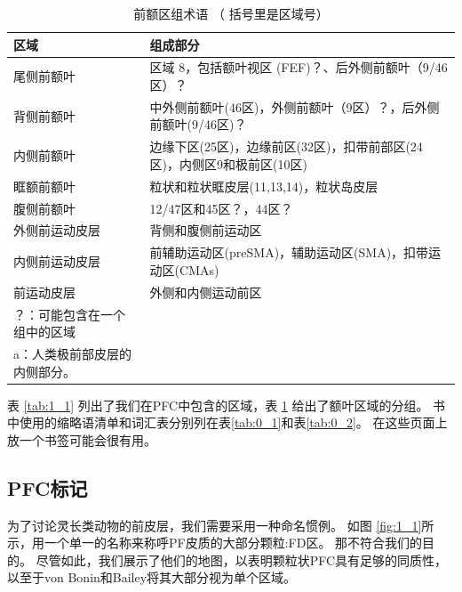 \begin{table}[htbp] 
	\newcommand{\tabincell}[2]{\begin{tabular}{@{}#1@{}}#2\end{tabular}} %
	\centering
	\caption{前额区组术语 （ 括号里是区域号）\label{tab:1_2}}
	\renewcommand\arraystretch{1.5}	%
	\begin{tabular}{ll}
		\toprule
		区域 & 组成部分 \\
		\midrule
		尾侧前额叶 & 区域 8，包括额叶视区 (FEF)？、后外侧前额叶（9/46区）？  \\
		背侧前额叶 & 中外侧前额叶(46区)，外侧前额叶（9区）？，后外侧前额叶(9/46区)？ \\
		内侧前额叶&边缘下区(25区)，边缘前区(32区)，扣带前部区(24区)，内侧区9和极前区(10区)  \\
		眶额前额叶 & 粒状和粒状眶皮层(11,13,14)，粒状岛皮层  \\
		腹侧前额叶&12/47区和45区？，44区？ \\
		外侧前运动皮层 & 背侧和腹侧前运动区\\
		内侧前运动皮层 & 前辅助运动区(preSMA)，辅助运动区(SMA)，扣带运动区(CMAs)  \\
		前运动皮层 & 外侧和内侧运动前区  \\
		\bottomrule
	\par？：可能包含在一个组中的区域\\
		\par a：人类极前部皮层的内侧部分。
	\end{tabular}%
\end{table}%


\par
表 \ref{tab:1_1} 列出了我们在PFC中包含的区域，表 \ref{tab:1_2} 给出了额叶区域的分组。
书中使用的缩略语清单和词汇表分别列在表\ref{tab:0_1}和表\ref{tab:0_2}。
在这些页面上放一个书签可能会很有用。


\subsection{PFC标记}
为了讨论灵长类动物的前皮层，我们需要采用一种命名惯例。
如图 \ref{fig:1_1}所示，用一个单一的名称来称呼PF皮质的大部分颗粒:FD区\cite{von1947neocortex}。
那不符合我们的目的。
尽管如此，我们展示了他们的地图，以表明颗粒状PFC具有足够的同质性，以至于von Bonin和Bailey将其大部分视为单个区域。

